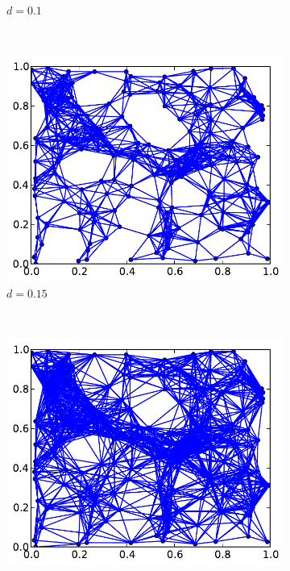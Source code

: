 \begin{figure}[H]
\begin{subfigure}[b]{0.45\textwidth}
    \caption{$d = 0.1$}
    \label{fig:geo2}    
   \end{subfigure}
    ~ %
  \begin{subfigure}[b]{0.45\textwidth}
    \centering
    \includegraphics[scale=0.65]{../code/final_results/geometric_graphs/geo3.pdf}
    \caption{$d = 0.15$}
    \label{fig:geo3}    
   \end{subfigure}
    ~ %
  \begin{subfigure}[b]{0.45\textwidth}
    \centering
    \includegraphics[scale=0.65]{../code/final_results/geometric_graphs/geo4.pdf}

\end{subfigure}
\end{figure}

